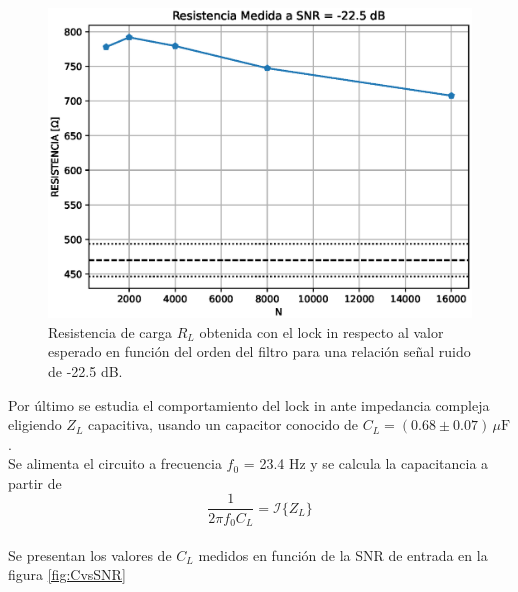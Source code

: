 \documentclass[11pt,a4paper]{extarticle}
\begin{document}
\begin{multicols}{2}
\begin{figure}[H]
	\centering
	\includegraphics[width=\linewidth]{Images/R_orden.eps}
	\caption{Resistencia de carga $R_L$ obtenida con 
	el lock in respecto al valor esperado en función
	del orden del filtro para  
	una relación señal ruido de -22.5 dB.}
	\label{fig:RORDEN}
\end{figure}

Por último se estudia el comportamiento del lock in ante impedancia compleja eligiendo $Z_L$ capacitiva, usando un capacitor conocido de $C_L = (0.68 \pm 0.07) \, \mu \mathrm F$.\\

Se alimenta el circuito a frecuencia $f_0$ = 23.4 Hz y se calcula la capacitancia a partir de
\begin{equation*}
	\frac{1}{2\pi f_0 C_L} = \mathcal I \{Z_L\}
\end{equation*}\\[-1em]

Se presentan los valores de $C_L$ medidos en función de la SNR de entrada en la figura \ref{fig:CvsSNR}\\ 


\end{multicols}
\end{document}
